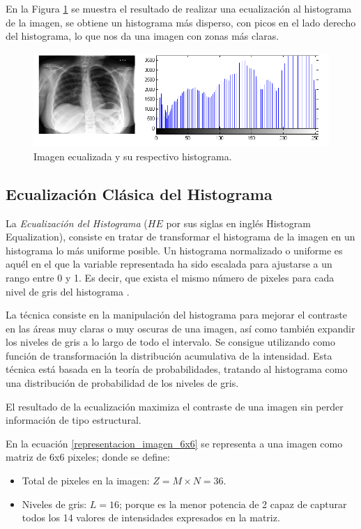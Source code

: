 En la Figura \ref{imagen25_hist_ecua} se muestra el resultado de realizar una ecualización al histograma de la imagen, se obtiene un histograma más disperso, con picos en el lado derecho del histograma, lo que nos da una imagen con zonas más claras.

\begin{figure}[H]
    \includegraphics[width=15cm] {imagen25_Hist_Ecua.png}
    \caption{Imagen ecualizada y su respectivo histograma.}
    \label{imagen25_hist_ecua}
\end{figure}


\subsection{Ecualización Clásica del Histograma}
\label{sec:ecualizacion_histograma}

La \textit{Ecualización del Histograma} ($HE$ por sus siglas en inglés Histogram Equalization), consiste en tratar de transformar el histograma de la imagen en un histograma lo más uniforme posible. Un histograma normalizado o uniforme es aquél en el que la variable representada ha sido escalada para ajustarse a un rango entre 0 y 1. Es decir, que exista el mismo número de pixeles para cada nivel de gris del histograma \cite{byong2013}.

La técnica consiste en la manipulación del histograma para mejorar el contraste en las áreas muy claras o muy oscuras de una imagen, así como también expandir los niveles de gris a lo largo de todo el intervalo. Se consigue utilizando como función de transformación la distribución acumulativa de la intensidad. Esta técnica está basada en la teoría de probabilidades, tratando al histograma como una distribución de probabilidad de los niveles de gris.

El resultado de la ecualización maximiza el contraste de una imagen sin perder información de tipo estructural.

En la ecuación \ref{representacion_imagen_6x6} se representa a una imagen como matriz de 6x6 pixeles; donde se define:
\begin{itemize}
    \item Total de pixeles en la imagen: $Z=M \times N=36$.
    \item Niveles de gris: $L=16$; porque es la menor potencia de 2 capaz de capturar todos los 14 valores de intensidades expresados en la matriz.
\end{itemize}

